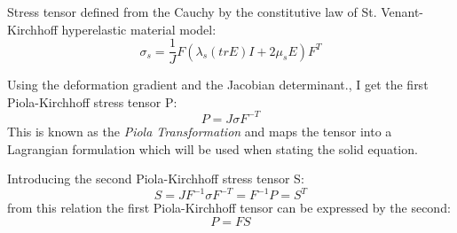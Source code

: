 Stress tensor defined from the Cauchy by the constitutive law of St. Venant-Kirchhoff hyperelastic material model: 
\begin{equation}
 \sigma_s = \frac{1}{J} F(\lambda_s (tr E)I + 2\mu_sE) F^T
\end{equation}

Using the deformation gradient and the Jacobian determinant., I get the first Piola-Kirchhoff stress tensor P:
\begin{equation}
 P = J \sigma F^{-T} 
\end{equation}
This is known as the \textit{Piola Transformation} and maps the tensor into a Lagrangian formulation which will be used when stating the solid equation.

Introducing the second Piola-Kirchhoff stress tensor S:
\begin{equation}
S = J F^{-1}\sigma F^{-T} = F^{-1} P = S^T 
\end{equation}
from this relation the first Piola-Kirchhoff tensor can be expressed by the second:
\begin{equation}
P = FS
\end{equation}
